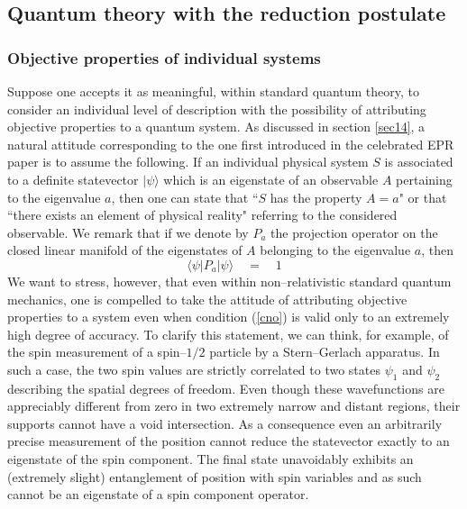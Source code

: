 \documentclass[12pt]{article}
\begin{document}
\subsection{Quantum theory with the reduction postulate}
\label{sec101}

\subsubsection{Objective properties of individual systems}
\label{sec1011}

Suppose one accepts it as meaningful, within standard quantum
theory, to consider an individual level of description with the
possibility of attributing objective properties to a quantum
system. As discussed in section \ref{sec14}, a natural attitude
corresponding to the one first introduced in the celebrated EPR
paper \cite{epr} is to assume the following. If an individual
physical system $S$ is associated to a definite statevector
$|\psi\rangle$ which is an eigenstate of an observable $A$
pertaining to the eigenvalue $a$, then one can state that ``$S$
has the property $A=a$" or that ``there exists an element of
physical reality" referring  to the considered observable. We
remark that if we denote by $P_{a}$ the projection operator on the
closed linear manifold of the eigenstates of $A$ belonging to the
eigenvalue $a$, then
\begin{equation} \label{cno}
\langle\psi | P_{a} |\psi\rangle \quad = \quad 1
\end{equation}
We want to stress, however, that even within non--relativistic
standard quantum mechanics, one is compelled to take the attitude
of attributing objective properties to a system even when
condition (\ref{cno}) is valid only to an extremely high degree of
accuracy. To clarify this statement, we can think, for example, of
the spin measurement of a spin--$1/2$ particle by a Stern--Gerlach
apparatus. In such a case, the two spin values are strictly
correlated to two states $\psi_{1}$ and $\psi_{2}$ describing the
spatial degrees of freedom. Even though these wavefunctions are
appreciably different from zero in two extremely narrow and
distant regions, their supports cannot have a void intersection.
As a consequence even an arbitrarily precise measurement of the
position cannot reduce the statevector exactly to an eigenstate of
the spin component. The final state unavoidably exhibits an
(extremely slight) entanglement of position with spin variables
and as such cannot be an eigenstate of a spin component operator.
\end{document}

